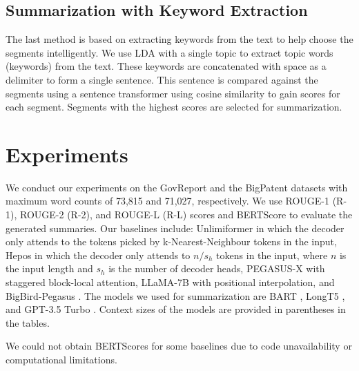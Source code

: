 \documentclass[letterpaper]{article} %
\begin{document}
\subsection{Summarization with Keyword Extraction}

The last method is based on extracting keywords from the text to help choose the segments intelligently.
We use LDA \cite{blei2003latent} with a single topic to extract topic words (keywords) from the text.
These keywords are concatenated with space as a delimiter to form a single sentence.
This sentence is compared against the segments using a sentence transformer using cosine similarity to gain scores for each segment.
Segments with the highest scores are selected for summarization.


\section{Experiments}

We conduct our experiments on the GovReport \cite{huang-etal-2021-efficient} and the BigPatent \cite{sharma-etal-2019-bigpatent} datasets with maximum word counts of 73,815 and 71,027, respectively.
We use ROUGE-1 (R-1), ROUGE-2 (R-2), and ROUGE-L (R-L) scores \cite{lin-2004-rouge} and BERTScore \cite{zhang2019bertscore} to evaluate the generated summaries.
Our baselines include: Unlimiformer \cite{bertsch2023unlimiformer} in which the decoder only attends to the tokens picked by k-Nearest-Neighbour tokens in the input, Hepos \cite{huang-etal-2021-efficient} in which the decoder only attends to $n/s_h$ tokens in the input, where $n$ is the input length and $s_h$ is the number of decoder heads, PEGASUS-X \cite{phang2022investigating} with staggered block-local attention, LLaMA-7B \cite{chen2022long} with positional interpolation, and BigBird-Pegasus \cite{zaheer2020big}.
The models we used for summarization are BART \cite{lewis-etal-2020-bart}, LongT5 \cite{guo2021longt5}, and GPT-3.5 Turbo \cite{brown2020language}.
Context sizes of the models are provided in parentheses in the tables.

We could not obtain BERTScores for some baselines due to code unavailability or computational limitations.
\end{document}
